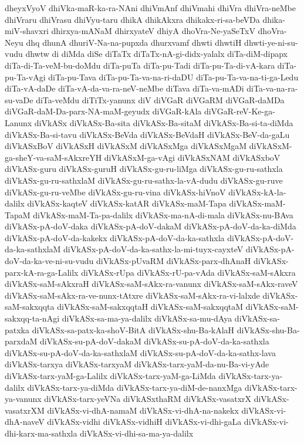 {dheyxVyoV
dhiVka-maR-ka-ra-NAni
dhiVmAnf
dhiVmahi
dhiVra
dhiVra-neMbe
dhiVraru
dhiVrasu
dhiVyu-taru
dhikA
dhikAkxra
dhikakx-ri-sa-beVDa
dhika-miV-shavxri
dhirxya-mANaM
dhirxyateV
dhiyA
dhoVra-Ne-yaSeTxV
dhoVra-Neyu
dhq
dhunA
dhuriV-Na-na-pupxda
dhurxvamf
dhwti
dhwtiH
dhwti-ye-ni-su-vudu
dhwtw
di
diMda
diSe
diTaTx
diTaTx-nA-gi-didx-yalalx
diTa-diM-dipapx
diTa-di-Ta-veM-bu-doMdu
diTa-puTa
diTa-pu-Tadi
diTa-pu-Ta-di-vA-kara
diTa-pu-Ta-vAgi
diTa-pu-Tava
diTa-pu-Ta-va-na-ri-daDU
diTa-pu-Ta-va-na-ti-ga-Ledu
diTa-vA-daDe
diTa-vA-da-va-ra-neV-neMbe
diTava
diTa-va-mADi
diTa-va-na-ra-su-vaDe
diTa-veMdu
diTiTx-yanunx
diV
diVGaR
diVGaRM
diVGaR-daMDa
diVGaR-daM-Da-parx-NA-maM-geyudx
diVGaR-kAla
diVGaR-reV-Ke-ga-Lanunx
diVkASx
diVkASx-Ba-sita
diVkASx-Ba-sitaM
diVkASx-Ba-si-ta-diMda
diVkASx-Ba-si-tavu
diVkASx-BeVda
diVkASx-BeVdaH
diVkASx-BeV-da-gaLu
diVkASxBoV
diVkASxH
diVkASxM
diVkASxMga
diVkASxMgaM
diVkASxM-ga-sheY-va-saM-sAkxreYH
diVkASxM-ga-vAgi
diVkASxNAM
diVkASxboV
diVkASx-guru
diVkASx-guruH
diVkASx-gu-ru-liMga
diVkASx-gu-ru-sathxla
diVkASx-gu-ru-sathxlaM
diVkASx-gu-ru-sathx-la-vA-dudu
diVkASx-gu-ruve
diVkASx-gu-ru-veMbe
diVkASx-gu-ru-vina
diVkASx-hiVnoV
diVkASx-kA-la-dalilx
diVkASx-kaqteV
diVkASx-katAR
diVkASx-maM-Tapa
diVkASx-maM-TapaM
diVkASx-maM-Ta-pa-dalilx
diVkASx-ma-nA-di-mala
diVkASx-nu-BAva
diVkASx-pA-doV-daka
diVkASx-pA-doV-dakaM
diVkASx-pA-doV-da-ka-diMda
diVkASx-pA-doV-da-kakekx
diVkASx-pA-doV-da-ka-sathxla
diVkASx-pA-doV-da-ka-sathxlaM
diVkASx-pA-doV-da-ka-sathx-la-mi-tuyx-cayxteV
diVkASx-pA-doV-da-ka-ve-ni-su-vudu
diVkASx-pUvaRM
diVkASx-parx-dhAnaH
diVkASx-parx-kA-ra-ga-Lalilx
diVkASx-rUpa
diVkASx-rU-pa-vAda
diVkASx-saM-sAkxra
diVkASx-saM-sAkxraH
diVkASx-saM-sAkx-ra-vanunx
diVkASx-saM-sAkx-raveV
diVkASx-saM-sAkx-ra-ve-nunx-tAtxre
diVkASx-saM-sAkx-ra-vi-lalxde
diVkASx-saM-sakxqqta
diVkASx-saM-sakxqqtaH
diVkASx-saM-sakxqqtaM
diVkASx-saM-sakxqq-ta-nAgi
diVkASx-sa-ma-ya-dalilx
diVkASx-sa-mu-dAya
diVkASx-sa-patxka
diVkASx-sa-patx-ka-shoV-BitA
diVkASx-shu-Ba-kAlaH
diVkASx-shu-Ba-parxdaM
diVkASx-su-pA-doV-dakaM
diVkASx-su-pA-doV-da-ka-sathxla
diVkASx-su-pA-doV-da-ka-sathxlaM
diVkASx-su-pA-doV-da-ka-sathx-lava
diVkASx-tarxya
diVkASx-tarxyaM
diVkASx-tarx-yaM-da-nu-Ba-vi-yAde
diVkASx-tarx-yaM-ga-Lalilx
diVkASx-tarx-yaM-ga-LiMda
diVkASx-tarx-ya-dalilx
diVkASx-tarx-ya-diMda
diVkASx-tarx-ya-diM-de-nanxMga
diVkASx-tarx-ya-vanunx
diVkASx-tarx-yeVNa
diVkASxthaRM
diVkASx-vasatxrX
diVkASx-vasatxrXM
diVkASx-vi-dhA-namaM
diVkASx-vi-dhA-na-nakekx
diVkASx-vi-dhA-naveV
diVkASx-vidhi
diVkASx-vidhiH
diVkASx-vi-dhi-gaLa
diVkASx-vi-dhi-karx-ma-sathxla
diVkASx-vi-dhi-sa-ma-ya-dalilx
}
